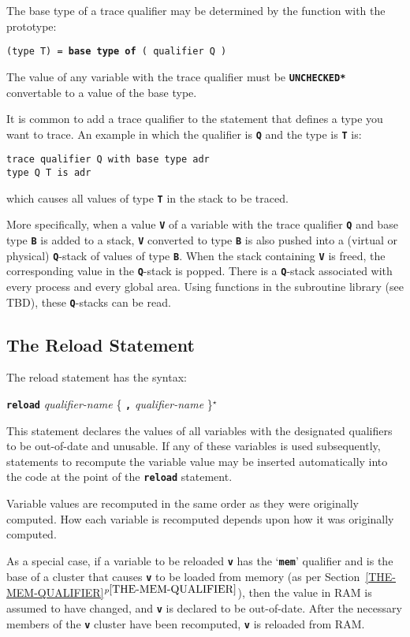 \documentclass[12pt]{article}
\makeatletter
\newcommand{\TT}[1]{{\tt \bfseries #1}}
\newcommand{\ttkey}[1]{\TT{#1}\index{#1@{\tt #1}}}
\newcommand{\itemref}[1]{\ref{#1}$^{p\pageref{#1}}$}
\newcommand{\STAR}{{\Large $^\star$}}
\newenvironment{indpar}[1][0.3in]%
	{\begin{list}{}%
		     {\setlength{\itemsep}{0in}%
		      \setlength{\topsep}{0in}%
		      \setlength{\parsep}{1ex}%
		      \setlength{\labelwidth}{#1}%
		      \setlength{\leftmargin}{#1}%
		      \addtolength{\leftmargin}{\labelsep}}%
	 \item}%
	{\end{list}}
\makeatother
\begin{document}
The base type of a trace qualifier may be determined by the
function with the prototype:
\begin{center}
{\tt (type T) = \ttkey{base type of} ( qualifier Q )}
\end{center}
The value of any variable with the trace qualifier must be
\TT{*UNCHECKED*} convertable to a value of the base type.

It is common to add a trace qualifier to the statement that
defines a type you want to trace.  An example in which the
qualifier is \TT{Q} and the type is \TT{T} is:
\begin{indpar}\begin{verbatim}
trace qualifier Q with base type adr
type Q T is adr
\end{verbatim}\end{indpar}
which causes all values of type \TT{T} in the stack to be
traced.

More specifically, when a value \TT{V} of a variable with the trace
qualifier \TT{Q} and base type \TT{B} is added to a stack,
\TT{V} converted to type \TT{B} is also
pushed into a (virtual or physical) \TT{Q}-stack of values of
type \TT{B}.
When the stack containing \TT{V} is freed, the corresponding
value in the \TT{Q}-stack is popped.  There is a \TT{Q}-stack
associated with every process and every global area.
Using functions in the
subroutine library (see TBD), these \TT{Q}-stacks can be read.

\subsection{The Reload Statement}
\label{THE-RELOAD-COMMAND}

The reload statement has the syntax:
\begin{center}
\ttkey{reload} {\em qualifier-name} \{ \TT{,} {\em qualifier-name} \}\STAR{}
\end{center}

This statement declares the values of all variables with the designated
qualifiers to be out-of-date and unusable.  If any of these variables
is used subsequently, statements to recompute the variable value
may be inserted automatically into the code at the point of the
\TT{reload} statement.

Variable values are recomputed in the same order as they were
originally computed.  How each variable is recomputed depends upon
how it was originally computed.

As a special case, if a variable to be reloaded
\TT{v} has the `\TT{mem}' qualifier and is the base of
a cluster that causes \TT{v} to be loaded from memory
(as per Section~\itemref{THE-MEM-QUALIFIER}), then the value
in RAM is assumed to have changed, and \TT{v} is declared to be out-of-date.
After the necessary members of the \TT{v} cluster have been recomputed,
\TT{v} is reloaded from RAM.
\end{document}
